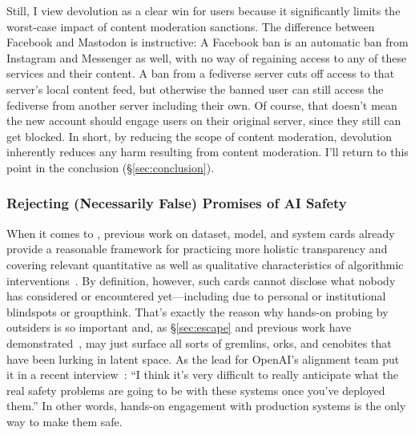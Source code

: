Still, I view devolution as a clear win for users because it significantly
limits the worst-case impact of content moderation sanctions. The difference
between Facebook and Mastodon is instructive: A Facebook ban is an automatic ban
from Instagram and Messenger as well, with no way of regaining access to any of
these services and their content. A ban from a fediverse server cuts off access
to that server's local content feed, but otherwise the banned user can still
access the fediverse from another server including their own. Of course, that
doesn't mean the new account should engage users on their original server, since
they still can get blocked. In short, by reducing the scope of content
moderation, devolution inherently reduces any harm resulting from content
moderation. I'll return to this point in the conclusion
(\S\ref{sec:conclusion}).


\subsubsection{Rejecting (Necessarily False) Promises of AI Safety}

When it comes to , previous work on dataset, model, and system cards already
provide a reasonable framework for practicing more holistic transparency and
covering relevant quantitative as well as qualitative characteristics of
algorithmic
interventions~\cite{GebruMorgensternea2021,MitchellWuea2019,ProcopeCheemaea2022}.
By definition, however, such cards cannot disclose what nobody has considered or
encountered yet---including due to personal or institutional blindspots or
groupthink. That's exactly the reason why hands-on probing by outsiders is so
important and, as \S\ref{sec:escape} and previous work have
demonstrated~\cite{BirhanePrabhuea2021,CarliniHayesea2023}, may just surface all
sorts of gremlins, orks, and cenobites that have been lurking in latent space.
As the lead for OpenAI's alignment team put it in a recent
interview~\cite{Heaven2023}: ``I think it's very difficult to really anticipate
what the real safety problems are going to be with these systems once you've
deployed them.'' In other words, hands-on engagement with production systems is
the only way to make them safe.

